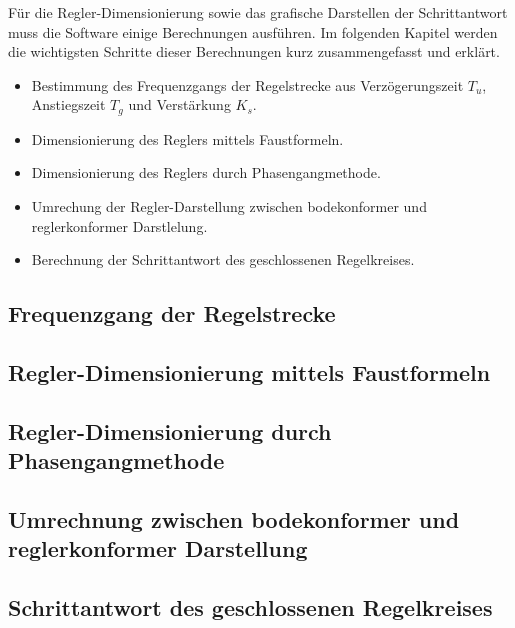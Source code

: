 
F\"ur   die  Regler-Dimensionierung   sowie  das   grafische  Darstellen   der
Schrittantwort  muss   die  Software  einige  Berechnungen   ausf\"uhren.   Im
folgenden  Kapitel werden  die wichtigsten  Schritte dieser  Berechnungen kurz
zusammengefasst und erkl\"art.

\begin{itemize}
    \item
    Bestimmung  des  Frequenzgangs  der  Regelstrecke  aus  Verz\"ogerungszeit
    $T_u$, Anstiegszeit $T_g$ und Verst\"arkung $K_s$.
    \item
    Dimensionierung des Reglers mittels Faustformeln.
    \item
    Dimensionierung des Reglers durch Phasengangmethode.
    \item
    Umrechung der Regler-Darstellung zwischen bodekonformer und reglerkonformer
    Darstlelung. 
    \item
    Berechnung der Schrittantwort des geschlossenen Regelkreises.
\end{itemize}

\subsection{Frequenzgang der Regelstrecke}


\subsection{Regler-Dimensionierung mittels Faustformeln}


\subsection{Regler-Dimensionierung durch Phasengangmethode}


\subsection{Umrechnung zwischen bodekonformer und reglerkonformer Darstellung}


\subsection{Schrittantwort des geschlossenen Regelkreises}

